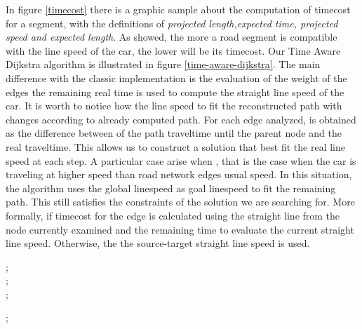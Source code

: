 \documentclass[5p]{elsarticle}
\begin{document}
In figure \ref{timecost} there is a graphic sample about the computation of timecost for a segment, with the definitions of \textit{projected length,expected time, projected speed and expected length}.
As showed, the more a road segment is compatible with the line speed of the car, the lower will be its timecost.  
Our Time Aware Dijkstra algorithm is illustrated in figure \ref{time-aware-dijkstra}. The main difference with the classic implementation is the evaluation of the weight of the edges  
the remaining real time is used to compute the straight line speed of the car. It is worth to notice how the line speed to fit the reconstructed path with changes according to already computed path. For each edge analyzed,  is obtained
as the difference between of the path traveltime until the parent node and the real traveltime. This allows us to construct a solution that best fit the real line speed at each step. A particular case arise when , that is the case
when the car is traveling at higher speed than road network edges usual speed. In this situation, the algorithm uses the global linespeed as goal linespeed to fit the remaining path. This still satisfies the constraints of the solution we are 
searching for. 
More formally, if  timecost for the edge is calculated using the straight line from the node currently examined and the remaining time to evaluate the current straight line speed. Otherwise, the the source-target 
straight line speed is used. 
 

 \begin{algorithm2e} [h]
\scriptsize{
\BlankLine
;\\
;\\
;\\
\While {} {
        ;\\
        \If {} {
            
        
        \For{}{
	      ;\\
              \\
              \If {}{
                  ;\\
                  ;\\
              \Else{
                  ;\\
                  ;\\
                   }
              }
              ;\\
              \If {}{
                  ;\\
                  ;\\
                  }
              
	}
	}
        \Else{
             
             
             \While{}
                   {;\\
                    ;\\}
             \Return {}; 
        }
}

\caption{}
\label{time-aware-dijkstra}}
\end{algorithm2e}
 
\end{document}
